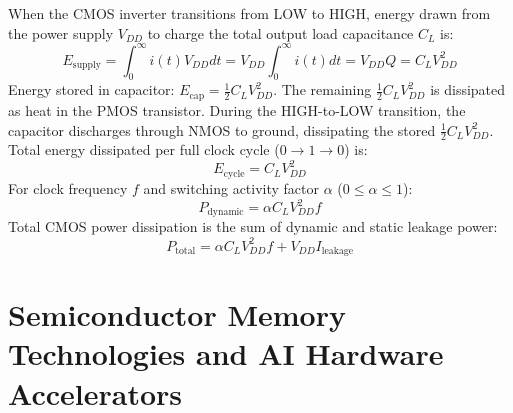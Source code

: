 \begin{derivationbox}
When the CMOS inverter transitions from LOW to HIGH, energy drawn from the power supply $V_{DD}$ to charge the total output load capacitance $C_L$ is:
\begin{equation}
    E_{\text{supply}} = \int_0^\infty i(t) V_{DD} dt = V_{DD} \int_0^\infty i(t) dt = V_{DD} Q = C_L V_{DD}^2
\end{equation}
Energy stored in capacitor: $E_{\text{cap}} = \frac{1}{2} C_L V_{DD}^2$. The remaining $\frac{1}{2} C_L V_{DD}^2$ is dissipated as heat in the PMOS transistor.
During the HIGH-to-LOW transition, the capacitor discharges through NMOS to ground, dissipating the stored $\frac{1}{2} C_L V_{DD}^2$.
Total energy dissipated per full clock cycle ($0 \to 1 \to 0$) is:
\begin{equation}
    E_{\text{cycle}} = C_L V_{DD}^2
\end{equation}
For clock frequency $f$ and switching activity factor $\alpha$ ($0 \le \alpha \le 1$):
\begin{equation}
    P_{\text{dynamic}} = \alpha C_L V_{DD}^2 f
\end{equation}
Total CMOS power dissipation is the sum of dynamic and static leakage power:
\begin{equation}
    P_{\text{total}} = \alpha C_L V_{DD}^2 f + V_{DD} I_{\text{leakage}}
\end{equation}
\end{derivationbox}

\section{Semiconductor Memory Technologies and AI Hardware Accelerators}
